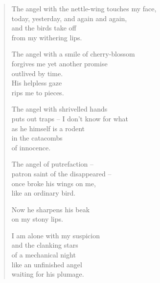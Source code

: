 \begin{verse}
The angel with the nettle-wing touches my face,\\
today, yesterday, and again and again,\\
and the birds take off\\
from my withering lips.

The angel with a smile of cherry-blossom\\
forgives me yet another promise\\
outlived by time.\\
His helpless gaze\\
rips me to pieces.

The angel with shrivelled hands\\
puts out traps -- I don't know for what\\
as he himself is a rodent\\
in the catacombs\\
of innocence.

The angel of putrefaction --\\
patron saint of the disappeared --\\
once broke his wings on me,\\
like an ordinary bird.

Now he sharpens his beak\\
on my stony lips.

I am alone with my suspicion\\
and the clanking stars\\
of a mechanical night\\
like an unfinished angel\\
waiting for his plumage.
\end{verse}


